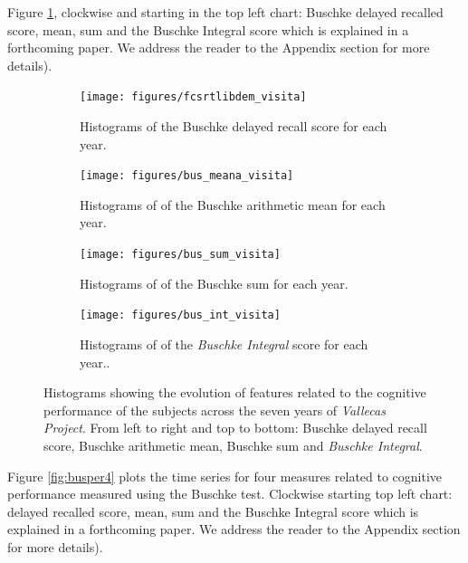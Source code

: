 \documentclass[11pt]{article}
\theoremstyle{definition}
\theoremstyle{remark}
\begin{document}
Figure \ref{fig:cogperyearsbus}, clockwise and starting in the top left chart: Buschke delayed recalled score, mean, sum and the Buschke Integral score which is explained in a forthcoming paper. We address the reader to the Appendix section for more details).

\begin{figure}[H]
    \centering
    \begin{subfigure}[t]{0.4\textwidth}
        \centering
        \texttt{[image: figures/fcsrtlibdem\_visita]}
        \caption{Histograms of the Buschke delayed recall score for each year.}
    \end{subfigure}
    \hfill
    \begin{subfigure}[t]{0.4\textwidth}
        \centering
        \texttt{[image: figures/bus\_meana\_visita]}
        \caption{Histograms of of the Buschke arithmetic mean for each year.}
    \end{subfigure}%
    
     \begin{subfigure}[t]{0.4\textwidth}
        \centering
        \texttt{[image: figures/bus\_sum\_visita]}
        \caption{Histograms of of the Buschke sum for each year.}
    \end{subfigure}
    \hfill
    \begin{subfigure}[t]{0.4\textwidth}
        \centering
        \texttt{[image: figures/bus\_int\_visita]}
        \caption{Histograms of of the \emph{Buschke Integral} score for each year..}
    \end{subfigure}%
   
    \caption{Histograms showing the evolution of features related to the cognitive performance of the subjects across the seven years of \emph{Vallecas Project}. From left to right and top to bottom: 
    Buschke delayed recall score, Buschke arithmetic mean, Buschke sum and \emph{Buschke Integral}.}
    \label{fig:cogperyearsbus}
\end{figure}


Figure \ref{fig:busper4} plots the time series for four measures related to cognitive performance measured using the Buschke test. Clockwise starting top left chart: delayed recalled score, mean, sum and the Buschke Integral score which is explained in a forthcoming paper. We address the reader to the Appendix section for more details).
\end{document}
